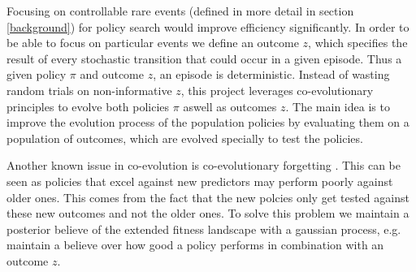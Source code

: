 
Focusing on controllable rare events (defined in more detail in section \ref{background}) for policy search would improve efficiency significantly. In order to be able to focus on particular events we define an outcome $z$, which specifies the result of every stochastic transition that could occur in a given episode. Thus a given policy $\pi$ and outcome $z$, an episode is deterministic. Instead of wasting random trials on non-informative $z$, this project leverages co-evolutionary principles to evolve both policies $\pi$ aswell as outcomes $z$. The main idea is to improve the evolution process of the population policies by evaluating them on a population of outcomes, which are evolved specially to test the policies.

Another known issue in co-evolution is co-evolutionary forgetting \cite{forgetting}. This can be seen as policies that excel against new predictors may perform poorly against older ones. This comes from the fact that the new polcies only get tested against these new outcomes and not the older ones. To solve this problem we maintain a posterior believe of the extended fitness landscape with a gaussian process, e.g. maintain a believe over how good a policy performs in combination with an outcome $z$.



